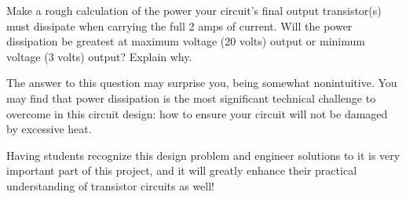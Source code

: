 

Make a rough calculation of the power your circuit's final output transistor(s) must dissipate when carrying the full 2 amps of current.  Will the power dissipation be greatest at maximum voltage (20 volts) output or minimum voltage (3 volts) output?  Explain why.







The answer to this question may surprise you, being somewhat nonintuitive.  You may find that power dissipation is the most significant technical challenge to overcome in this circuit design: how to ensure your circuit will not be damaged by excessive heat.







Having students recognize this design problem and engineer solutions to it is very important part of this project, and it will greatly enhance their practical understanding of transistor circuits as well!



